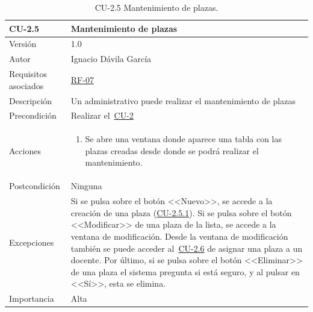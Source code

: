 \begin{table}[p]
	\centering
	\begin{tabularx}{\linewidth}{ p{} p{} }
		\toprule
		\textbf{CU-2.5}    & \textbf{Mantenimiento de plazas}\\
		\toprule
		{\small Versión}              & 1.0    \\
		{\small Autor}                & Ignacio Dávila García \\
		{\small Requisitos asociados} & \hyperref[itm:RF7]{RF-07} \\
		{\small Descripción}          & Un administrativo puede realizar el mantenimiento de plazas \\
		{\small Precondición}         & Realizar el~\hyperref[table:CU-2]{CU-2} \\
		{\small Acciones}             &
		\begin{enumerate}
			\def\labelenumi{\arabic{enumi}.}
			\tightlist
			\item Se abre una ventana donde aparece una tabla con las plazas creadas desde donde se podrá realizar el mantenimiento.
		\end{enumerate}\\
		{\small Postcondición}        & Ninguna \\
		{\small Excepciones}          & Si se pulsa sobre el botón <<Nuevo>>, se accede a la creación de una plaza (\hyperref[table:CU-2_5_1]{CU-2.5.1}). Si se pulsa sobre el botón <<Modificar>> de una plaza de la lista, se accede a la ventana de modificación. Desde la ventana de modificación también se puede acceder al~\hyperref[table:CU-2_6]{CU-2.6} de asignar una plaza a un docente. Por último, si se pulsa sobre el botón <<Eliminar>> de una plaza el sistema pregunta si está seguro, y al pulsar en <<Sí>>, esta se elimina. \\
		{\small Importancia}          & Alta \\
		\bottomrule
	\end{tabularx}
	\caption{CU-2.5 Mantenimiento de plazas.}\label{table:CU-2_5}
\end{table}
\FloatBarrier


